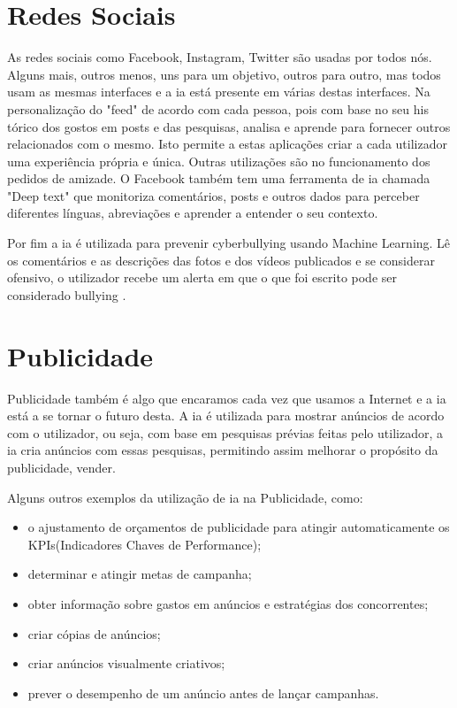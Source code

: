 \documentclass{report}
\begin{document}
\section{Redes Sociais}
As redes sociais como Facebook, Instagram, Twitter são usadas por todos nós. Alguns mais, outros menos, uns para um objetivo, outros para outro, mas todos usam as mesmas interfaces e a \ac{ia} está presente em várias destas interfaces. Na personalização do "feed" de acordo com cada pessoa, pois com base no seu his tórico dos gostos em posts e das pesquisas, analisa e aprende para fornecer outros relacionados com o mesmo. Isto permite a estas aplicações criar a cada utilizador uma experiência própria e única. Outras utilizações são no funcionamento dos pedidos de amizade. O Facebook também tem uma ferramenta de \ac{ia} chamada "Deep text" que monitoriza comentários, posts e outros dados para perceber diferentes línguas, abreviações e aprender a entender o seu contexto.

Por fim a \ac{ia} é utilizada para prevenir cyberbullying usando Machine Learning. Lê os comentários e as descrições das fotos e dos vídeos publicados e se considerar ofensivo, o utilizador recebe um alerta em que o que foi escrito pode ser considerado bullying \cite{Marr:2019}.

\section{Publicidade}
Publicidade também é algo que encaramos cada vez que usamos a Internet e a \ac{ia} está a se tornar o futuro desta. A \ac{ia} é utilizada para mostrar anúncios de acordo com o utilizador, ou seja, com base em pesquisas prévias feitas pelo utilizador, a \ac{ia} cria anúncios com essas pesquisas, permitindo assim melhorar o propósito da publicidade, vender.

Alguns outros exemplos da utilização de \ac{ia} na Publicidade\cite{Mike:2022}, como:

\begin{itemize}
    \item o ajustamento de orçamentos de publicidade para atingir automaticamente os KPIs(Indicadores Chaves de Performance);
    \item determinar e atingir metas de campanha;
    \item obter informação sobre gastos em anúncios e estratégias dos concorrentes;
    \item criar cópias de anúncios;
    \item criar anúncios visualmente criativos;
    \item prever o desempenho de um anúncio antes de lançar campanhas.
\end{itemize}
\end{document}
